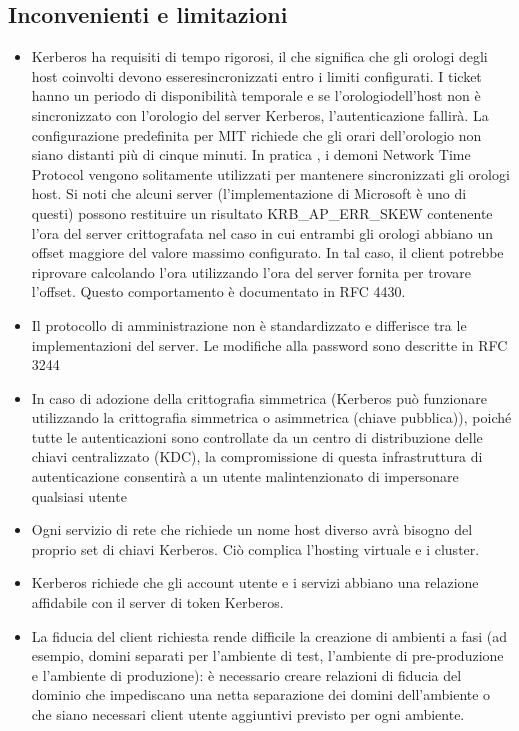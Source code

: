 \subsection{Inconvenienti e limitazioni}
\begin{itemize}
    \item Kerberos ha requisiti di tempo rigorosi, il che significa che gli orologi degli host coinvolti devono esseresincronizzati entro i limiti configurati. I ticket hanno un periodo di disponibilità temporale e se l'orologiodell'host non è sincronizzato con l'orologio del server Kerberos, l'autenticazione fallirà. La configurazione predefinita per MIT richiede che gli orari dell'orologio non siano distanti più di cinque minuti. In pratica , i demoni Network Time Protocol vengono solitamente utilizzati per mantenere sincronizzati gli orologi host. Si noti che alcuni server (l'implementazione di Microsoft è uno di questi) possono restituire un risultato KRB\_AP\_ERR\_SKEW contenente l'ora del server crittografata nel caso in cui entrambi gli orologi abbiano un offset maggiore del valore massimo configurato. In tal caso, il client potrebbe riprovare calcolando l'ora utilizzando l'ora del server fornita per trovare l'offset. Questo comportamento è documentato in RFC 4430.
    
    \item Il protocollo di amministrazione non è standardizzato e differisce tra le implementazioni del server. Le modifiche alla password sono descritte in RFC 3244
    
    \item In caso di adozione della crittografia simmetrica (Kerberos può funzionare utilizzando la crittografia simmetrica o asimmetrica (chiave pubblica)), poiché tutte le autenticazioni sono controllate da un centro di distribuzione delle chiavi centralizzato (KDC), la compromissione di questa infrastruttura di autenticazione consentirà a un utente malintenzionato di impersonare qualsiasi utente
    
    \item Ogni servizio di rete che richiede un nome host diverso avrà bisogno del proprio set di chiavi Kerberos. Ciò complica l'hosting virtuale e i cluster.
    
    \item Kerberos richiede che gli account utente e i servizi abbiano una relazione affidabile con il server di token Kerberos.
    
    \item La fiducia del client richiesta rende difficile la creazione di ambienti a fasi (ad esempio, domini separati per l'ambiente di test, l'ambiente di pre-produzione e l'ambiente di produzione): è necessario creare relazioni di fiducia del dominio che impediscano una netta separazione dei domini dell'ambiente o che siano necessari client utente aggiuntivi previsto per ogni ambiente.
\end{itemize}
